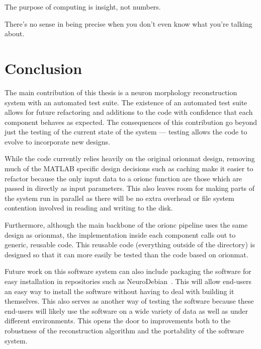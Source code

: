\begin{savequote}[0.55\linewidth]
	\begin{fancyquote}
		The purpose of computing is insight, not numbers.
	\end{fancyquote}
	\begin{fancyquote}
		There's no sense in being precise when you don't even know what
		you're talking about.
	\end{fancyquote}
\end{savequote}
\chapter{Conclusion}\label{ch:conclusion}

The main contribution of this thesis is a neuron morphology
reconstruction system with an automated test suite. The existence
of an automated test suite allows for future refactoring and
additions to the code with confidence that each component behaves
as expected. The consequences of this contribution go beyond just
the testing of the current state of the system --- testing allows
the code to evolve to incorporate new designs.

While the code currently relies heavily on the original
\gls{orionmat} design, removing much of the MATLAB specific design
decisions such as caching make it easier to refactor because the
only input data to a \gls{orionc} function are those which are passed in
directly as input parameters. This also leaves room for making
parts of the system run in parallel as there will be no extra
overhead or file system contention involved in reading and writing
to the disk.

Furthermore, although the main backbone of the \gls{orionc}
pipeline uses the same design as \gls{orionmat}, the
implementation inside each component calls out to generic,
reusable code. This reusable code (everything outside of the
 directory) is designed so that it
can more easily be tested than the code based on \gls{orionmat}.

Future work on this software system can also include packaging the
software for easy installation in repositories such as
NeuroDebian~\autocite{NeuroDebian:Halchenko:2012}. This will allow
end-users an easy way to install the software without having to
deal with building it themselves. This also serves as another way
of testing the software because these end-users will likely use
the software on a wide variety of data as well as under different
environments. This opens the door to improvements both to the
robustness of the reconstruction algorithm and the portability of
the software system.

